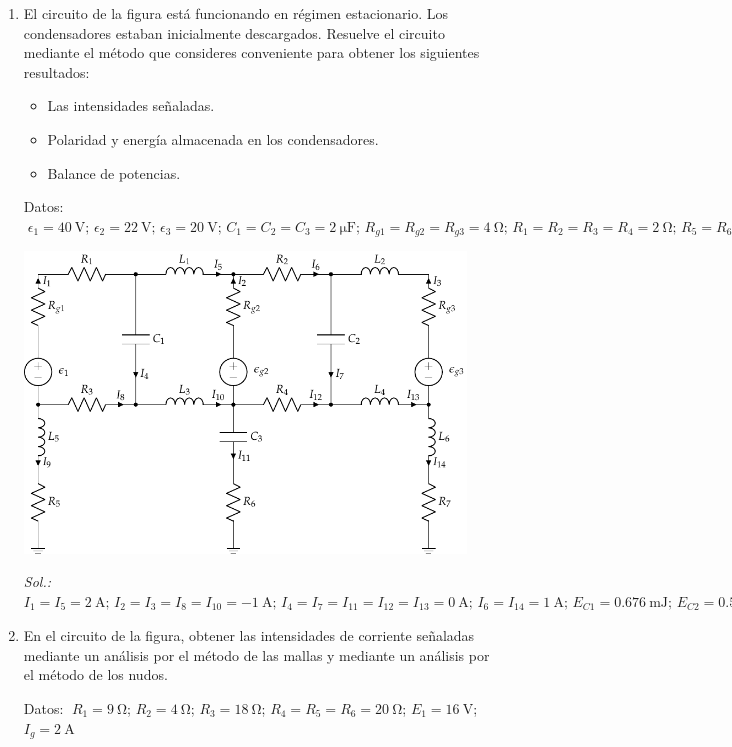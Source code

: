 \begin{enumerate}
\item El circuito de la figura está funcionando en régimen
  estacionario. Los condensadores estaban inicialmente
  descargados. Resuelve el circuito mediante el método que consideres
  conveniente para obtener los siguientes resultados:
  \begin{itemize}
  \item Las intensidades señaladas.
  \item Polaridad y energía almacenada en los condensadores.
  \item Balance de potencias.
  \end{itemize}
  Datos:
  $\; \epsilon_{1}=\qty{40}{\volt};\, \epsilon_{2}=\qty{22}{\volt};\, \epsilon_{3}=\qty{20}{\volt};\,
  C_{1}=C_{2}=C_{3}=\qty{2}{\micro\farad};\, R_{g1}=R_{g2}=R_{g3}=\qty{4}{\ohm};\,
  R_{1}=R_{2}=R_{3}=R_{4}=\qty{2}{\ohm};\, R_{5}=R_{6}=R_{7}=\qty{1}{\ohm}$
  \begin{center}
    \includegraphics[height=8cm]{../figs/mallas_condensadores_bobinas.pdf}
  \end{center}
  \emph{Sol.:\;
    $I_1=I_5=\qty{2}{\ampere};\, I_2=I_3=I_8=I_{10}=\qty{-1}{\ampere};\,
    I_4=I_7=I_{11}=I_{12}=I_{13}=\qty{0}{\ampere};\, I_6=I_{14}=\qty{1}{\ampere};\, E_{C1}=\qty{0.676}{\milli\joule};\,
    E_{C2}=\qty{0.576}{\milli\joule}; \, E_{C3}=\qty{1}{\micro\joule}; P_g = P_R$}
 
\item En el circuito de la figura, obtener las
  intensidades de corriente señaladas mediante un análisis por el
  método de las mallas y mediante un análisis por el método de los
  nudos.

  Datos: $\; R_1 = \qty{9}{\ohm}$; $R_2 = \qty{4}{\ohm}$; $R_3 = \qty{18}{\ohm}$; $R_4 = R_5 = R_6 = \qty{20}{\ohm}$; $E_1 = \qty{16}{\volt}$; $I_g = \qty{2}{\ampere}$
  

\end{enumerate}
